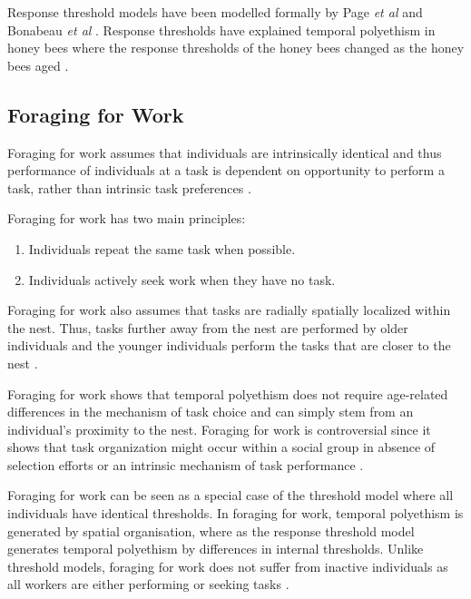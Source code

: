 Response threshold models have been modelled formally by Page \textit{et al} \cite{page1990self} and Bonabeau \textit{et al} \cite{bonabeau1999role}. Response thresholds have explained temporal polyethism in honey bees where the response thresholds of the honey bees changed as the honey bees aged \cite{robinson1987regulation}.

\subsection{Foraging for Work}
\label{foragingforwork}
Foraging for work assumes that individuals are intrinsically identical and thus performance of individuals at a task is dependent on opportunity to perform a task, rather than intrinsic task preferences \cite{franks1994foraging}.

Foraging for work has two main principles:
\begin{enumerate}
	\item Individuals repeat the same task when possible.
	\item Individuals actively seek work when they have no task.
\end{enumerate}


Foraging for work also assumes that tasks are radially spatially localized within the nest. Thus, tasks further away from the nest are performed by older individuals and the younger individuals perform the tasks that are closer to the nest \cite{tofts1993algorithms}.

Foraging for work shows that temporal polyethism does not require age-related differences in the mechanism of task choice and can simply stem from an individual's proximity to the nest. Foraging for work is controversial since it shows that task organization might occur within a social group in absence of selection efforts or an intrinsic mechanism of task performance \cite{franks1994foraging}. 

Foraging for work can be seen as a special case of the threshold model where all individuals have identical thresholds. In foraging for work, temporal polyethism is generated by spatial organisation, where as the response threshold model generates temporal polyethism by differences in internal thresholds. Unlike threshold models, foraging for work does not suffer from inactive individuals as all workers are either performing or seeking tasks \cite{beshers2001models}.

